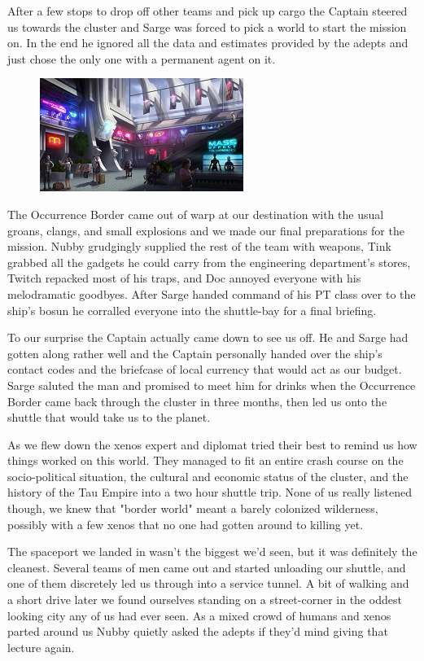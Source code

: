 After a few stops to drop off other teams and pick up cargo the Captain steered us towards the cluster and Sarge was forced to pick a world to start the mission on. 
In the end he ignored all the data and estimates provided by the adepts and just chose the only one with a permanent agent on it.

\begin{figure}
	\begin{center}
		\includegraphics[width=\figwidth]{pics/10/12.png}
	\end{center}
\end{figure}
The Occurrence Border came out of warp at our destination with the usual groans, clangs, and small explosions and we made our final preparations for the mission. 
Nubby grudgingly supplied the rest of the team with weapons, Tink grabbed all the gadgets he could carry from the engineering department's stores, Twitch repacked most of his traps, and Doc annoyed everyone with his melodramatic goodbyes. 
After Sarge handed command of his PT class over to the ship's bosun he corralled everyone into the shuttle-bay for a final briefing.

To our surprise the Captain actually came down to see us off. 
He and Sarge had gotten along rather well and the Captain personally handed over the ship's contact codes and the briefcase of local currency that would act as our budget. 
Sarge saluted the man and promised to meet him for drinks when the Occurrence Border came back through the cluster in three months, then led us onto the shuttle that would take us to the planet.

As we flew down the xenos expert and diplomat tried their best to remind us how things worked on this world. 
They managed to fit an entire crash course on the socio-political situation, the cultural and economic status of the cluster, and the history of the Tau Empire into a two hour shuttle trip. 
None of us really listened though, we knew that "border world" meant a barely colonized wilderness, possibly with a few xenos that no one had gotten around to killing yet.

The spaceport we landed in wasn't the biggest we'd seen, but it was definitely the cleanest. 
Several teams of men came out and started unloading our shuttle, and one of them discretely led us through into a service tunnel. 
A bit of walking and a short drive later we found ourselves standing on a street-corner in the oddest looking city any of us had ever seen. 
As a mixed crowd of humans and xenos parted around us Nubby quietly asked the adepts if they'd mind giving that lecture again.

